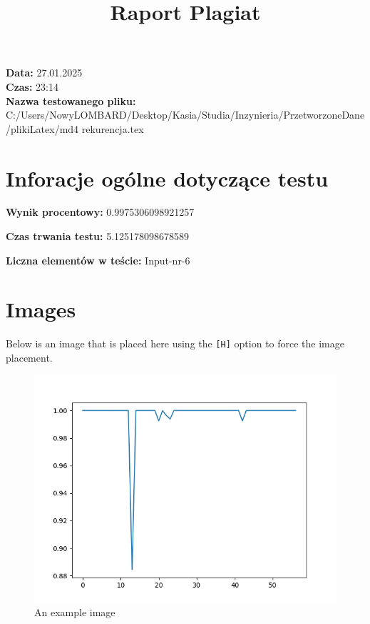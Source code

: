 \documentclass{article}
\title{Raport Plagiat}
\date{}
\begin{document}
\maketitle

\begin{center}
    \textbf{Data:} 27.01.2025 \\
    \textbf{Czas:} 23:14 \\
    \textbf{Nazwa testowanego pliku:} C:/Users/NowyLOMBARD/Desktop/Kasia/Studia/Inzynieria/PrzetworzoneDane/plikiLatex/md4 rekurencja.tex
\end{center}

\section{Inforacje ogólne dotyczące testu}

\textbf{Wynik procentowy:} 0.9975306098921257

\textbf{Czas trwania testu:} 5.125178098678589

\textbf{Liczna elementów w teście:} Input-nr-6


\section{Images}

Below is an image that is placed here using the \texttt{[H]} option to force the image placement.

\begin{figure}[H]
\centering
\includegraphics[width=1\textwidth]{ elements/plot0.png }
\caption{An example image}
\end{figure}
\end{document}
